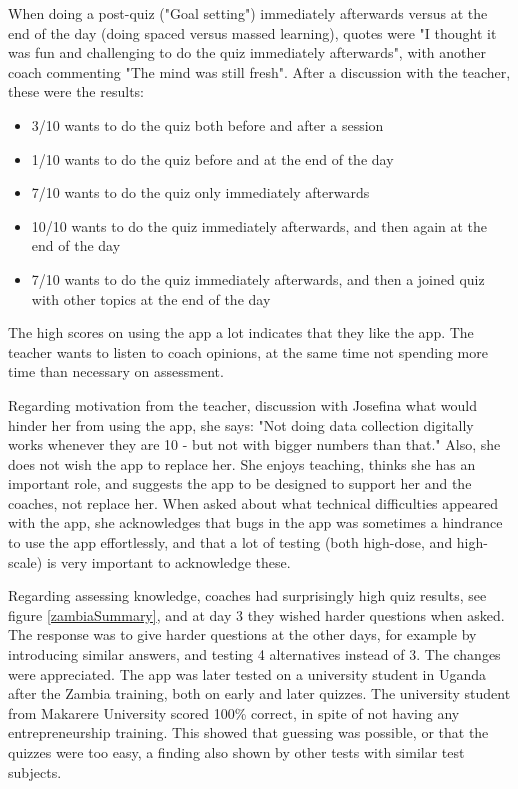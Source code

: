     When doing a post-quiz ("Goal setting") immediately afterwards versus at the end of the day (doing spaced versus massed learning), quotes were "I thought it was fun and challenging to do the quiz immediately afterwards", with another coach commenting "The mind was still fresh". After a discussion with the teacher, these were the results:




    \begin{itemize}
    \item 3/10 wants to do the quiz both before and after a session
    \item 1/10 wants to do the quiz before and at the end of the day
    \item 7/10 wants to do the quiz only immediately afterwards
    \item 10/10 wants to do the quiz immediately afterwards, and then again at the end of the day
    \item 7/10 wants to do the quiz immediately afterwards, and then a joined quiz with other topics at the end of the day
    \end{itemize}

    The high scores on using the app a lot indicates that they like the app. The teacher wants to listen to coach opinions, at the same time not spending more time than necessary on assessment.

    Regarding motivation from the teacher, discussion with Josefina what would hinder her from using the app, she says: "Not doing data collection digitally works whenever they are 10 - but not with bigger numbers than that." Also, she does not wish the app to replace her. She enjoys teaching, thinks she has an important role, and suggests the app to be designed to support her and the coaches, not replace her. When asked about what technical difficulties appeared with the app, she acknowledges that bugs in the app was sometimes a hindrance to use the app effortlessly, and that a lot of testing (both high-dose, and high-scale) is very important to acknowledge these.

    Regarding assessing knowledge, coaches had surprisingly high quiz results, see figure \ref{zambiaSummary}, and at day 3 they wished harder questions when asked. The response was to give harder questions at the other days, for example by introducing similar answers, and testing 4 alternatives instead of 3. The changes were appreciated. The app was later tested on a university student in Uganda after the Zambia training, both on early and later quizzes. The university student from Makarere University scored 100\% correct, in spite of not having any entrepreneurship training. This showed that guessing was possible, or that the quizzes were too easy, a finding also shown by other tests with similar test subjects.

